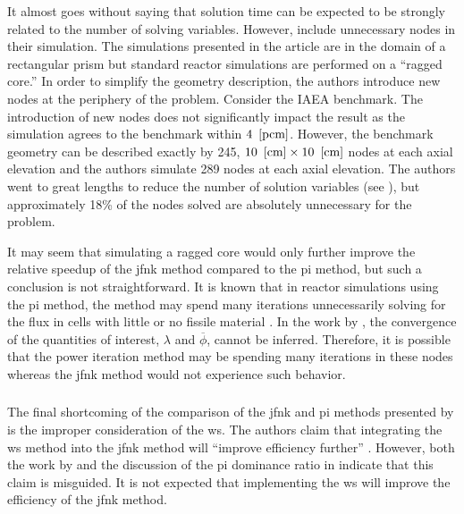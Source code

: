       It almost goes without saying that solution time can be expected to be
      strongly related to the number of solving variables. However,
      \citeauthor{qe2paper} include unnecessary nodes in their simulation. The
      simulations presented in the article are in the domain of a rectangular
      prism but standard reactor simulations are performed on a ``ragged core.''
      In order to simplify the geometry description, the authors introduce new
      nodes at the periphery of the problem. Consider the IAEA benchmark. The
      introduction of new nodes does not significantly impact the result as the
      simulation agrees to the benchmark within $4~\left[\text{{pcm}}\right]$. However, the
      benchmark geometry can be described exactly by 245, $10~\left[\text{{cm}}\right] \times
      10~\left[\text{{cm}}\right]$ nodes at each axial elevation and the authors simulate 289
      nodes at each axial elevation. The authors went to great lengths to reduce
      the number of solution variables (see ), but
      approximately 18\% of the nodes solved are absolutely unnecessary for the
      problem.

      It may seem that simulating a ragged core would only further improve the
      relative speedup of the \gls{jfnk} method compared to the \gls{pi}
      method, but such a conclusion is not straightforward. It is known that in
      reactor simulations using the \gls{pi} method, the method may spend many 
      iterations unnecessarily solving for the flux in cells with little or no 
      fissile material \cite{gehinThesis}. In the work by \citeauthor{qe2paper},
      the convergence of the quantities of interest, $\lambda$ and
      $\overline{\phi}$, cannot be inferred. Therefore, it is possible that the
      power iteration method may be spending many iterations in these nodes
      whereas the \gls{jfnk} method would not experience such behavior.

    \subsubsection{\texorpdfstring{}{Wielandt Shift}}
    \label{sec:wielandt_shift}

      The final shortcoming of the comparison of the \gls{jfnk} and \gls{pi}
      methods presented by \citeauthor{qe2paper} is the improper consideration 
      of the \gls{ws}. The authors claim that integrating the \gls{ws} method
      into the \gls{jfnk} method will ``improve efficiency further''
      \cite{qe2paper}. However, both the work by \citeauthor{gill_azmy} and the
      discussion of the \gls{pi} dominance ratio in 
      indicate that this claim is misguided. It is not expected that
      implementing the \gls{ws} will improve the efficiency of the \gls{jfnk}
      method.

